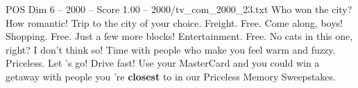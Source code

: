 \begin{textsample}{POS Dim 6 – 2000 – Score 1.00 – 2000/tv\_com\_2000\_23.txt}  \label{ex:f6_pos_087}
Who won the city?
How romantic!
Trip to the city of your choice.
Freight.
Free.
Come along, boys!
Shopping.
Free.
Just a few more blocks!
Entertainment.
Free.
No cats in this one, right?
I don't think so!
Time with people who make you feel warm and fuzzy.
Priceless.
Let 's go!
Drive fast!
Use your MasterCard and you could win a getaway with people you 're \textbf{closest} to in our Priceless Memory Sweepstakes.

\end{textsample}
